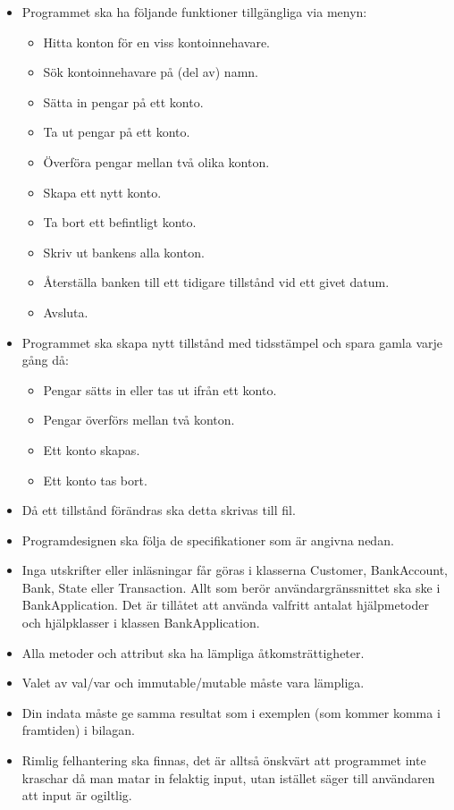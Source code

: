 \begin{itemize}
\item Programmet ska ha följande funktioner tillgängliga via menyn:

\begin{itemize}
\item Hitta konton för en viss kontoinnehavare.
\item Sök kontoinnehavare på (del av) namn.
\item Sätta in pengar på ett konto.
\item Ta ut pengar på ett konto.
\item Överföra pengar mellan två olika konton.
\item Skapa ett nytt konto.
\item Ta bort ett befintligt konto.
\item Skriv ut bankens alla konton.
\item Återställa banken till ett tidigare tillstånd vid ett givet datum.
\item Avsluta.
\end{itemize}

\item Programmet ska skapa nytt tillstånd med tidsstämpel och spara gamla varje gång då:
\begin{itemize}
\item Pengar sätts in eller tas ut ifrån ett konto.
\item Pengar överförs mellan två konton.
\item Ett konto skapas.
\item Ett konto tas bort.
\end{itemize}
\item Då ett tillstånd förändras ska detta skrivas till fil.
\item Programdesignen ska följa de specifikationer som är angivna nedan.
\item Inga utskrifter eller inläsningar får göras i klasserna Customer, BankAccount, Bank, State eller Transaction. Allt som berör användargränssnittet ska ske i BankApplication. Det är tillåtet att använda valfritt antalat hjälpmetoder och hjälpklasser i klassen BankApplication.
\item Alla metoder och attribut ska ha lämpliga åtkomsträttigheter.
\item Valet av val/var och immutable/mutable måste vara lämpliga.
\item Din indata måste ge samma resultat som i exemplen (som kommer komma i framtiden) i bilagan.
\item Rimlig felhantering ska finnas, det är alltså önskvärt att programmet inte kraschar då man matar in felaktig input, utan istället säger till användaren att input är ogiltlig.

\end{itemize}

